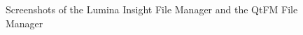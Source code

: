%

\begin{figure}[p]
\centering
  \caption{Screenshots of the Lumina Insight File Manager and the QtFM File Manager}
\vfill
  \label{fig:fm}
\end{figure}

%


